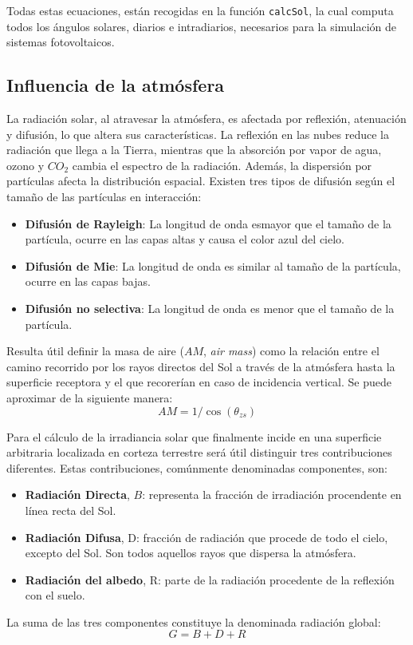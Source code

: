 Todas estas ecuaciones, están recogidas en la función \texttt{calcSol}, la cual computa todos los ángulos solares, diarios e intradiarios, necesarios para la simulación de sistemas fotovoltaicos.

\subsection{Influencia de la atmósfera}
\label{sec:org6e7d076}
La radiación solar, al atravesar la atmósfera, es afectada por reflexión, atenuación y difusión, lo que altera sus características. La reflexión en las nubes reduce la radiación que llega a la Tierra, mientras que la absorción por vapor de agua, ozono y \(CO_2\) cambia el espectro de la radiación. Además, la dispersión por partículas afecta la distribución espacial. Existen tres tipos de difusión según el tamaño de las partículas en interacción:
\begin{itemize}
\item \textbf{Difusión de Rayleigh}: La longitud de onda esmayor que el tamaño de la partícula, ocurre en las capas altas y causa el color azul del cielo.
\item \textbf{Difusión de Mie}: La longitud de onda es similar al tamaño de la partícula, ocurre en las capas bajas.
\item \textbf{Difusión no selectiva}: La longitud de onda es menor que el tamaño de la partícula.
\end{itemize}

Resulta útil definir la masa de aire (\(AM\), \emph{air mass}) como la relación entre el camino recorrido por los rayos directos del Sol a través de la atmósfera hasta la superficie receptora y el que recorerían en caso de incidencia vertical. Se puede aproximar de la siguiente manera: 
\begin{equation}
AM = 1/\cos(\theta_{zs})
\end{equation}

Para el cálculo de la irradiancia solar que finalmente incide en una superficie arbitraria localizada en corteza terrestre será útil distinguir tres contribuciones diferentes. Estas contribuciones, comúnmente denominadas componentes, son:
\begin{itemize}
\item \textbf{Radiación Directa}, \(B\): representa la fracción de irradiación procendente en línea recta del Sol. 
\item \textbf{Radiación Difusa}, D: fracción de radiación que procede de todo el cielo, excepto del Sol. Son todos aquellos rayos que dispersa la atmósfera.
\item \textbf{Radiación del albedo}, R: parte de la radiación procedente de la reflexión con el suelo.
\end{itemize}
La suma de las tres componentes constituye la denominada radiación global: 
\begin{equation}
G = B + D + R
\label{eq:comp_rad}
\end{equation}


